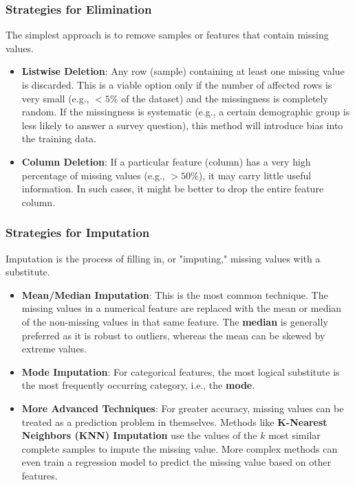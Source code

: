 \subsubsection*{Strategies for Elimination}
The simplest approach is to remove samples or features that contain missing values.
\begin{itemize}
    \item \textbf{Listwise Deletion}: Any row (sample) containing at least one missing value is discarded. This is a viable option only if the number of affected rows is very small (e.g., $<5\%$ of the dataset) and the missingness is completely random. If the missingness is systematic (e.g., a certain demographic group is less likely to answer a survey question), this method will introduce bias into the training data.
    \item \textbf{Column Deletion}: If a particular feature (column) has a very high percentage of missing values (e.g., $>50\%$), it may carry little useful information. In such cases, it might be better to drop the entire feature column.
\end{itemize}

\subsubsection*{Strategies for Imputation}
Imputation is the process of filling in, or "imputing," missing values with a substitute.
\begin{itemize}
    \item \textbf{Mean/Median Imputation}: This is the most common technique. The missing values in a numerical feature are replaced with the mean or median of the non-missing values in that same feature. The \textbf{median} is generally preferred as it is robust to outliers, whereas the mean can be skewed by extreme values.
    \item \textbf{Mode Imputation}: For categorical features, the most logical substitute is the most frequently occurring category, i.e., the \textbf{mode}.
    \item \textbf{More Advanced Techniques}: For greater accuracy, missing values can be treated as a prediction problem in themselves. Methods like \textbf{K-Nearest Neighbors (KNN) Imputation} use the values of the $k$ most similar complete samples to impute the missing value. More complex methods can even train a regression model to predict the missing value based on other features.
\end{itemize}

